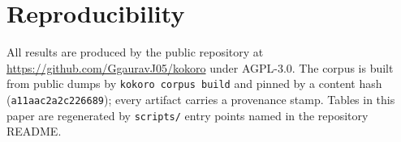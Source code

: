 \documentclass[11pt,a4paper]{article}
\begin{document}
\section*{Reproducibility}

All results are produced by the public repository at
\url{https://github.com/GgauravJ05/kokoro} under AGPL-3.0. The corpus is built
from public dumps by \texttt{kokoro corpus build} and pinned by a content hash
(\texttt{a11aac2a2c226689}); every artifact carries a provenance stamp. Tables
in this paper are regenerated by \texttt{scripts/} entry points named in the
repository README.
\end{document}
